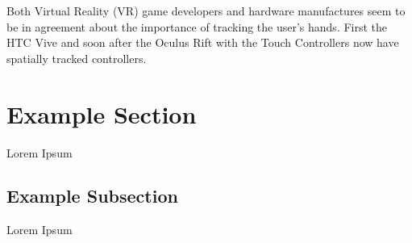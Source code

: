 Both Virtual Reality (VR) game developers and hardware manufactures seem to be in agreement about the importance of tracking the user's hands. First the HTC Vive \parencite{htcvive2016} and soon after the Oculus Rift with the Touch Controllers \parencite{oculus2016} now have spatially tracked controllers.
\section{Example Section}
\label{sec:exampleSection}

Lorem Ipsum

\subsection{Example Subsection}
\label{subsec:exampleSubsection}

Lorem Ipsum
